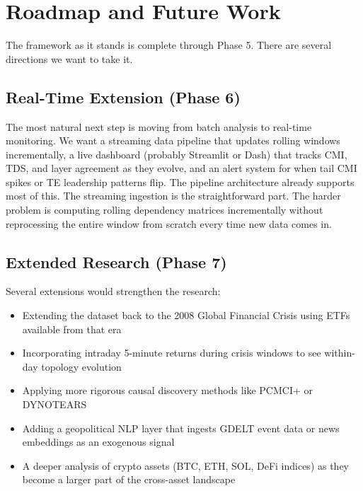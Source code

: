 \documentclass[12pt, letterpaper]{article}
\begin{document}
\section{Roadmap and Future Work}

The framework as it stands is complete through Phase 5. There are several directions we want to take it.

\subsection{Real-Time Extension (Phase 6)}

The most natural next step is moving from batch analysis to real-time monitoring. We want a streaming data pipeline that updates rolling windows incrementally, a live dashboard (probably Streamlit or Dash) that tracks CMI, TDS, and layer agreement as they evolve, and an alert system for when tail CMI spikes or TE leadership patterns flip. The pipeline architecture already supports most of this. The streaming ingestion is the straightforward part. The harder problem is computing rolling dependency matrices incrementally without reprocessing the entire window from scratch every time new data comes in.

\subsection{Extended Research (Phase 7)}

Several extensions would strengthen the research:

\begin{itemize}
    \item Extending the dataset back to the 2008 Global Financial Crisis using ETFs available from that era
    \item Incorporating intraday 5-minute returns during crisis windows to see within-day topology evolution
    \item Applying more rigorous causal discovery methods like PCMCI+ or DYNOTEARS
    \item Adding a geopolitical NLP layer that ingests GDELT event data or news embeddings as an exogenous signal
    \item A deeper analysis of crypto assets (BTC, ETH, SOL, DeFi indices) as they become a larger part of the cross-asset landscape
\end{itemize}
\end{document}
